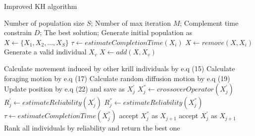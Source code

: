 \documentclass[journal]{IEEEtran}
\begin{document}
\begin{algorithm}
\caption{Improved KH algorithm}
\label{alg2}
\begin{algorithmic}[1]

\REQUIRE Number of population size $S$; Number of max iteration $M$; Complement time constrain $D$;
\ENSURE The best solution;
\STATE Generate initial population as $X \leftarrow \{X_1, X_2, ..., X_{S}\}$
  \STATE $\tau \leftarrow estimateCompletionTime(X_i)$
      \STATE $X \leftarrow remove(X, X_i)$
      \STATE Generate a valid individual $X_v$
      \STATE $X \leftarrow add(X, X_v)$
  \ENDIF
\ENDFOR


    \STATE Calculate movement induced by other krill individuals by e.q (15)
    \STATE Calculate foraging motion by e.q (17)
    \STATE Calculate random diffusion motion by e.q (19)
    \STATE Update position by e.q (22) and save as $X_j^{'}$
    \STATE $X_j^{''} \leftarrow crossoverOperator(X_j^{'})$
    \STATE $R_j^{'} \leftarrow estimateReliability(X_j^{'})$
    \STATE $R_j^{''} \leftarrow estimateReliability(X_j^{''})$
    \STATE $\tau \leftarrow estimateCompletionTime(X_j^{''})$
      \STATE accept $X_j^{''}$ as $X_{j+1}$
    \ELSE
      \STATE accept $X_j^{'}$ as $X_{j+1}$
    \ENDIF
  \ENDFOR
\ENDFOR
\STATE Rank all individuals by reliability and return the best one
\end{algorithmic}
\end{algorithm}
\end{document}
